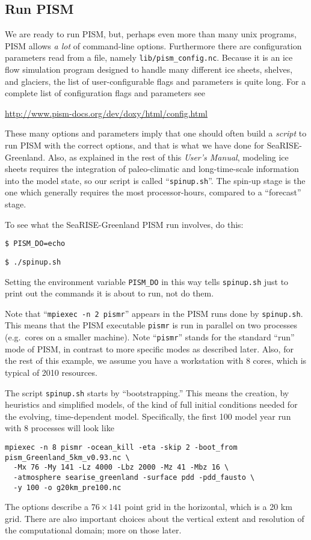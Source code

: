 \subsection{Run PISM}

We are ready to run PISM, but, perhaps even more than many unix programs, PISM allows \emph{a lot} of command-line options.  Furthermore there are configuration parameters read from a file, namely \verb|lib/pism_config.nc|.  Because it is an ice flow simulation program designed to handle many different ice sheets, shelves, and glaciers, the list of user-configurable flags and parameters is quite long.  For a complete list of configuration flags and parameters see
\begin{center}
\url{http://www.pism-docs.org/dev/doxy/html/config.html}
\end{center}

These many options and parameters imply that one should often build a \emph{script} to run PISM with the correct options, and that is what we have done for SeaRISE-Greenland.  Also, as explained in the rest of this \emph{User's Manual}, modeling ice sheets requires the integration of paleo-climatic and long-time-scale information into the model state, so our script is called ``\verb|spinup.sh|''.  The spin-up stage is the one which generally requires the most processor-hours, compared to a ``forecast'' stage.

To see what the SeaRISE-Greenland PISM run involves, do this:

\verb|$ PISM_DO=echo|

\verb|$ ./spinup.sh|

\noindent Setting the environment variable \verb|PISM_DO| in this way tells \verb|spinup.sh| just to print out the commands it is about to run, not do them.

Note that ``\verb|mpiexec -n 2 pismr|'' appears in the PISM runs done by \verb|spinup.sh|.  This means that the PISM executable \verb|pismr| is run in parallel on two processes (e.g.~cores on a smaller machine).  Note ``\verb|pismr|'' stands for the standard ``run'' mode of PISM, in contrast to more specific modes as described later.  Also, for the rest of this example, we assume you have a workstation with 8 cores, which is typical of 2010 resources.

The script \verb|spinup.sh| starts by ``bootstrapping.''  This means the creation, by heuristics and simplified models, of the kind of full initial conditions needed for the evolving, time-dependent model.  Specifically, the first 100 model year run with 8 processes will look like
\begin{verbatim}
mpiexec -n 8 pismr -ocean_kill -eta -skip 2 -boot_from pism_Greenland_5km_v0.93.nc \
  -Mx 76 -My 141 -Lz 4000 -Lbz 2000 -Mz 41 -Mbz 16 \
  -atmosphere searise_greenland -surface pdd -pdd_fausto \
  -y 100 -o g20km_pre100.nc
\end{verbatim}
The options describe a $76\times 141$ point grid in the horizontal, which is a 20 km grid.  There are also important choices about the vertical extent and resolution of the computational domain; more on those later.

